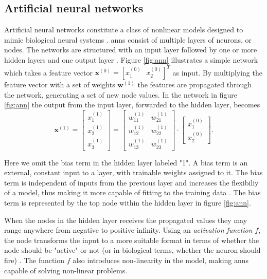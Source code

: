 \subsection{Artificial neural networks}
Artificial neural networks constitute a class of nonlinear models designed to mimic biological neural systems \citep{rojas_1996}. \gls{ann}s consist of multiple layers of neurons, or nodes. The networks are structured with an input layer followed by one or more hidden layers and one output layer \citep{logan_2017}. Figure \ref{fig:ann} illustrates a simple network which takes a feature vector $\mathbf{x}^{(0)}=[x_1^{(0)}\text{ }  x_2^{(0)}]^{T}$ as input. By multiplying the feature vector with a set of weights $\mathbf{w}^{(1)}$ the features are propagated through the network, generating a set of new node values. In the network in figure \ref{fig:ann} the output from the input layer, forwarded to the hidden layer, becomes
\begin{equation}
	\mathbf{x}^{(1)}=\begin{bmatrix}x_1^{(1)} \\ x_2^{(1)} \\ x_3^{(1)} \end{bmatrix} = 
	\begin{bmatrix} w_{11}^{(1)} & w_{21}^{(1)} \\ w_{12}^{(1)} & w_{22}^{(1)} \\ w_{13}^{(1)} & w_{23}^{(1)}\end{bmatrix}\cdot \begin{bmatrix}x_1^{(0)} \\ x_2^{(0)}\end{bmatrix}.
\end{equation}

Here we omit the bias term in the hidden layer labeled "1". A bias term is an external, constant input to a layer, with trainable weights assigned to it. The bias term is independent of inputs from the previous layer and increases the flexibiliy of a model, thus making it more capable of fitting to the training data \citep{kohl_2010}. The bias term is represented by the top node within the hidden layer in figure \ref{fig:ann}. 

When the nodes in the hidden layer receives the propagated values they may range anywhere from negative to positive infinity. Using an \textit{activation function} $f$, the node transforms the input to a more suitable format in terms of whether the node should be "active" or not (or in biological terms, whether the neuron should fire) \citep{kriesel_2007}. The function $f$ also introduces non-linearity in the model, making \gls{ann}s capable of solving non-linear problems. 

